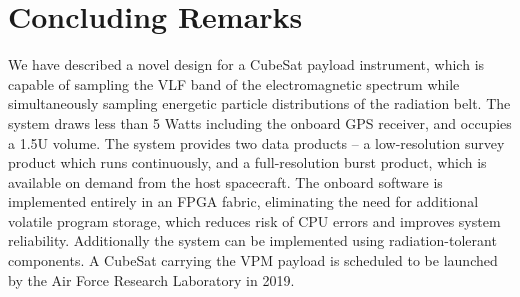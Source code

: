 \section{Concluding Remarks}
We have described a novel design for a CubeSat payload instrument, which is capable of sampling the VLF band of the electromagnetic spectrum while simultaneously sampling energetic particle distributions of the radiation belt. The system draws less than 5 Watts including the onboard GPS receiver, and occupies a 1.5U volume. The system provides two data products -- a low-resolution survey product which runs continuously, and a full-resolution burst product, which is available on demand from the host spacecraft. The onboard software is implemented entirely in an FPGA fabric, eliminating the need for additional volatile program storage, which reduces risk of CPU errors and improves system reliability. Additionally the system can be implemented using radiation-tolerant components. A CubeSat carrying the VPM payload is scheduled to be launched by the Air Force Research Laboratory in 2019.



